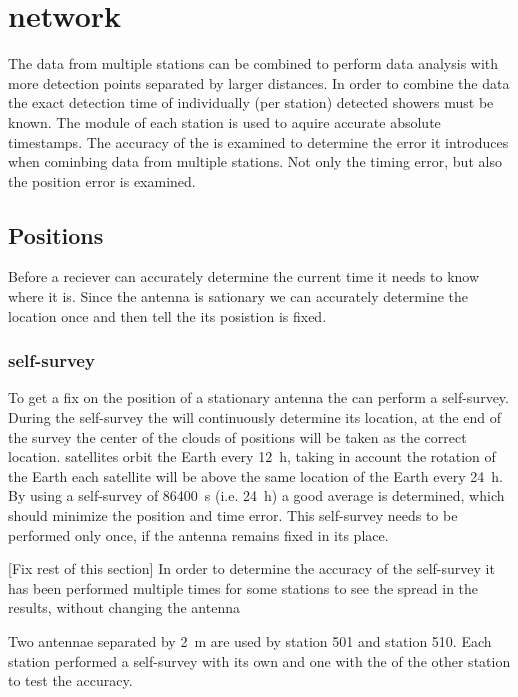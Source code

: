 \chapter{\hisparc network}
\label{ch:cluster}

The data from multiple \hisparc stations can be combined to perform data analysis with more detection points separated by larger distances. In order to combine the data the exact detection time of individually (per station) detected showers must be known. The \gps module of each station is used to aquire accurate absolute timestamps. The accuracy of the \gps is examined to determine the error it introduces when cominbing data from multiple stations. Not only the timing error, but also the position error is examined.


\section{Positions}

Before a \gps reciever can accurately determine the current time it needs to know where it is. Since the \gps antenna is sationary we can accurately determine the \gps location once and then tell the \gps its posistion is fixed.


\subsection{\gps self-survey}

To get a fix on the position of a stationary \gps antenna the \gps can perform a self-survey. During the self-survey the \gps will continuously determine its location, at the end of the survey the center of the clouds of positions will be taken as the correct location. \gps satellites orbit the Earth every \SI{12}{\hour}, taking in account the rotation of the Earth each \gps satellite will be above the same location of the Earth every \SI{24}{\hour}. By using a self-survey of \SI{86400}{\second} (i.e. \SI{24}{\hour}) a good average is determined, which should minimize the position and time error. This self-survey needs to be performed only once, if the \gps antenna remains fixed in its place.


[Fix rest of this section]
In order to determine the accuracy of the self-survey it has been performed multiple times for some stations to see the spread in the results, without changing the antenna

Two \gps antennae separated by \SI{2}{\meter} are used by station 501 and station 510. Each station performed a self-survey with its own \gps and one with the \gps of the other station to test the accuracy.
%
%

